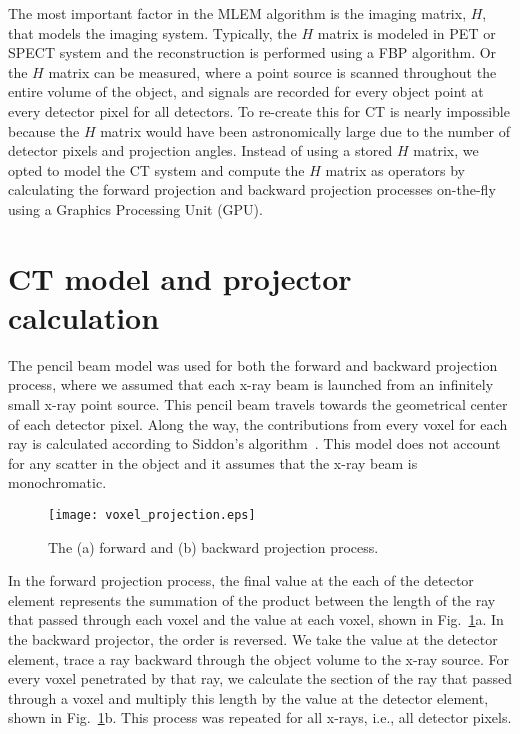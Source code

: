 The most important factor in the MLEM algorithm is the imaging matrix, $H$, that models the imaging system.  Typically, the $H$ matrix is modeled in PET or SPECT system and the reconstruction is performed using a FBP algorithm.  Or the $H$ matrix can be measured, where a point source is scanned throughout the entire volume of the object, and signals are recorded for every object point at every detector pixel for all detectors.  To re-create this for CT is nearly impossible because the $H$ matrix would have been astronomically large due to the number of detector pixels and projection angles.  Instead of using a stored $H$ matrix, we opted to model the CT system and compute the $H$ matrix as operators by calculating the forward projection and backward projection processes on-the-fly using a Graphics Processing Unit (GPU).

\section{CT model and projector calculation}
The pencil beam model was used for both the forward and backward projection process, where we assumed that each x-ray beam is launched from an infinitely small x-ray point source. This pencil beam travels towards the geometrical center of each detector pixel.  Along the way, the contributions from every voxel for each ray is calculated according to Siddon's algorithm~\citep{Siddon1985}.  This model does not account for any scatter in the object and it assumes that the x-ray beam is monochromatic.
%
\begin{figure}[h]
\centering
\texttt{[image: voxel\_projection.eps]}
\caption{The (a) forward and (b) backward projection process.}
\label{fig:voxel_projection}
\end{figure}

In the forward projection process, the final value at the each of the detector element represents the summation of the product between the length of the ray that passed through each voxel and the value at each voxel, shown in Fig.~\ref{fig:voxel_projection}a.  In the backward projector, the order is reversed. We take the value at the detector element, trace a ray backward through the object volume to the x-ray source.  For every voxel penetrated by that ray, we calculate the section of the ray that passed through a voxel and multiply this length by the value at the detector element, shown in Fig.~\ref{fig:voxel_projection}b.  This process was repeated for all x-rays, i.e., all detector pixels.

